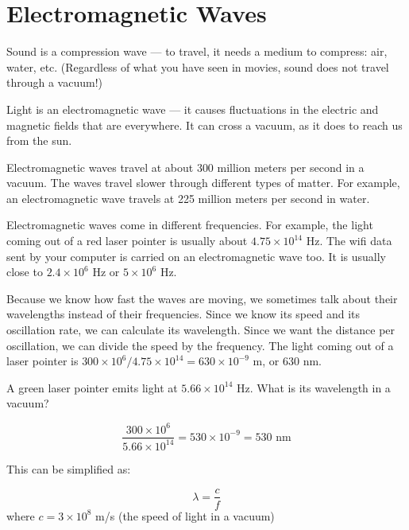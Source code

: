 \chapter{Electromagnetic Waves}

Sound is a compression wave --- to travel, it needs a medium to
compress: air, water, etc. (Regardless of what you have seen in
movies, sound does not travel through a vacuum!)

Light is an electromagnetic wave --- it causes fluctuations in the
electric and magnetic fields that are everywhere. It can cross a
vacuum, as it does to reach us from the sun.

Electromagnetic waves travel at about 300 million meters per second in a
vacuum. The waves travel slower through different types of matter. For example, an
electromagnetic wave travels at 225 million meters per second in water.

Electromagnetic waves come in different frequencies. For example, the
light coming out of a red laser pointer is usually about $4.75 \times
10^{14}$ Hz.  The wifi data sent by your computer is carried on an
electromagnetic wave too. It is usually close to $2.4 \times 10^6$ Hz
or $5 \times 10^6$ Hz.

Because we know how fast the waves are moving, we sometimes talk about
their wavelengths instead of their frequencies.  Since we know its speed
and its oscillation rate, we can calculate its wavelength. Since we want 
the distance per oscillation, we can divide the speed by the frequency. The light coming out
of a laser pointer is $300 \times 10^6 / 4.75 \times 10^{14} = 630
\times 10^{-9}$ m, or 630 nm.

\begin{Exercise}[title={Wavelengths}, label=wave_length_green]

  A green laser pointer emits light at $5.66 \times
10^{14}$ Hz. What is its wavelength in a vacuum?
  
\end{Exercise}
\begin{Answer}[ref=wave_length_green]
$$\frac{300 \times 10^6}{5.66 \times 10^{14}} = 530 \times 10^{-9} = 530\text{ nm}$$
\end{Answer}

This can be simplified as:

$$\lambda = \frac{c}{f}$$
where $c = 3 \times 10^8$ m/s (the speed of light in a vacuum)

